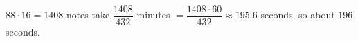 $88\cdot16=1408$ notes take $\dfrac{1408}{432}$ minutes $=\dfrac{1408\cdot60}{432}\approx195.6$ seconds, so about $\boxed{196}$ seconds.
